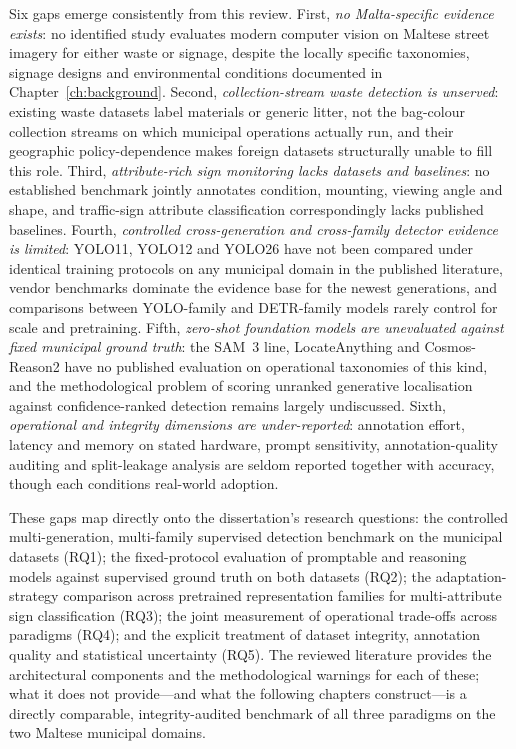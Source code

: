 Six gaps emerge consistently from this review. First, \emph{no Malta-specific evidence exists}: no identified study evaluates modern computer vision on Maltese street imagery for either waste or signage, despite the locally specific taxonomies, signage designs and environmental conditions documented in Chapter~\ref{ch:background}. Second, \emph{collection-stream waste detection is unserved}: existing waste datasets label materials or generic litter, not the bag-colour collection streams on which municipal operations actually run, and their geographic policy-dependence makes foreign datasets structurally unable to fill this role. Third, \emph{attribute-rich sign monitoring lacks datasets and baselines}: no established benchmark jointly annotates condition, mounting, viewing angle and shape, and traffic-sign attribute classification correspondingly lacks published baselines. Fourth, \emph{controlled cross-generation and cross-family detector evidence is limited}: YOLO11, YOLO12 and YOLO26 have not been compared under identical training protocols on any municipal domain in the published literature, vendor benchmarks dominate the evidence base for the newest generations, and comparisons between YOLO-family and DETR-family models rarely control for scale and pretraining. Fifth, \emph{zero-shot foundation models are unevaluated against fixed municipal ground truth}: the SAM~3 line, LocateAnything and Cosmos-Reason2 have no published evaluation on operational taxonomies of this kind, and the methodological problem of scoring unranked generative localisation against confidence-ranked detection remains largely undiscussed. Sixth, \emph{operational and integrity dimensions are under-reported}: annotation effort, latency and memory on stated hardware, prompt sensitivity, annotation-quality auditing and split-leakage analysis are seldom reported together with accuracy, though each conditions real-world adoption.

These gaps map directly onto the dissertation's research questions: the controlled multi-generation, multi-family supervised detection benchmark on the municipal datasets (RQ1); the fixed-protocol evaluation of promptable and reasoning models against supervised ground truth on both datasets (RQ2); the adaptation-strategy comparison across pretrained representation families for multi-attribute sign classification (RQ3); the joint measurement of operational trade-offs across paradigms (RQ4); and the explicit treatment of dataset integrity, annotation quality and statistical uncertainty (RQ5). The reviewed literature provides the architectural components and the methodological warnings for each of these; what it does not provide---and what the following chapters construct---is a directly comparable, integrity-audited benchmark of all three paradigms on the two Maltese municipal domains.
